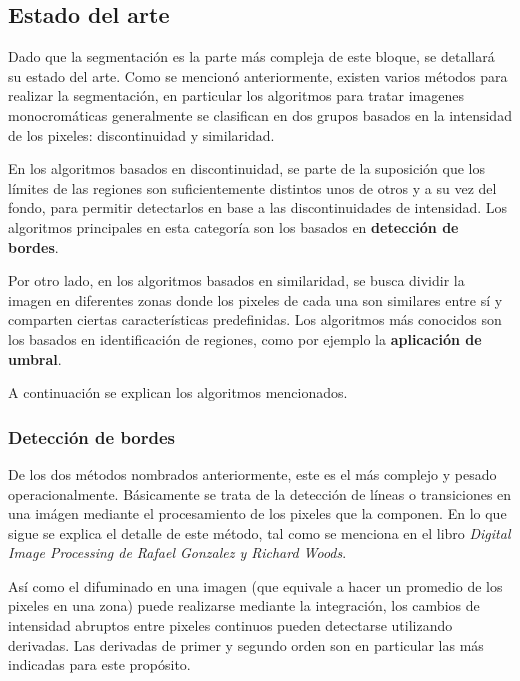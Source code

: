 \subsection{Estado del arte}%
\label{segEstArt}

Dado que la segmentación es la parte más compleja de este bloque, se detallará su estado del arte. Como se mencionó anteriormente, existen varios métodos para realizar la segmentación, en particular los algoritmos para tratar imagenes monocromáticas generalmente se clasifican en dos grupos basados en la intensidad de los pixeles: discontinuidad y similaridad. 

En los algoritmos basados en discontinuidad, se parte de la suposición que los límites de las regiones son suficientemente distintos unos de otros y a su vez del fondo, para permitir detectarlos en base a las discontinuidades de intensidad. Los algoritmos principales en esta categoría son los basados en \textbf{detección de bordes}.

Por otro lado, en los algoritmos basados en similaridad, se busca dividir la imagen en diferentes zonas donde los pixeles de cada una son similares entre sí y comparten ciertas características predefinidas. Los algoritmos más conocidos son los basados en identificación de regiones, como por ejemplo la \textbf{aplicación de umbral}.

A continuación se explican los algoritmos mencionados.

\subsubsection{Detección de bordes}
\label{detecbordeSec}

De los dos métodos nombrados anteriormente, este es el más complejo y pesado operacionalmente. Básicamente se trata de la detección de líneas o transiciones en una imágen mediante el procesamiento de los pixeles que la componen. En lo que sigue se explica el detalle de este método, tal como se menciona en el libro \textit{Digital Image Processing de Rafael Gonzalez y Richard Woods}\cite{Gonzalez}.

Así como el difuminado en una imagen (que equivale a hacer un promedio de los pixeles en una zona) puede realizarse mediante la integración, los cambios de intensidad abruptos entre pixeles continuos pueden detectarse utilizando derivadas. Las derivadas de primer y segundo orden son en particular las más indicadas para este propósito.

